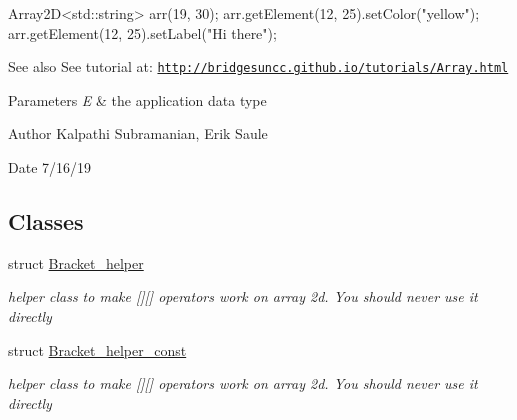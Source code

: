 \begin{DoxyCode}
Array2D<std::string> arr(19, 30);
arr.getElement(12, 25).setColor(\textcolor{stringliteral}{"yellow"});
arr.getElement(12, 25).setLabel(\textcolor{stringliteral}{"Hi there"});
\end{DoxyCode}


\begin{DoxySeeAlso}{See also}
See tutorial at\+: \href{http://bridgesuncc.github.io/tutorials/Array.html}{\tt http\+://bridgesuncc.\+github.\+io/tutorials/\+Array.\+html}
\end{DoxySeeAlso}

\begin{DoxyParams}{Parameters}
{\em E} & the application data type\\
\hline
\end{DoxyParams}
\begin{DoxyAuthor}{Author}
Kalpathi Subramanian, Erik Saule 
\end{DoxyAuthor}
\begin{DoxyDate}{Date}
7/16/19 
\end{DoxyDate}
\subsection*{Classes}
\begin{DoxyCompactItemize}
\item 
struct \hyperlink{structbridges_1_1datastructure_1_1_array2_d_1_1_bracket__helper}{Bracket\+\_\+helper}
\begin{DoxyCompactList}\small\item\em helper class to make \mbox{[}\mbox{]}\mbox{[}\mbox{]} operators work on array 2d. You should never use it directly \end{DoxyCompactList}\item 
struct \hyperlink{structbridges_1_1datastructure_1_1_array2_d_1_1_bracket__helper__const}{Bracket\+\_\+helper\+\_\+const}
\begin{DoxyCompactList}\small\item\em helper class to make \mbox{[}\mbox{]}\mbox{[}\mbox{]} operators work on array 2d. You should never use it directly \end{DoxyCompactList}\end{DoxyCompactItemize}
